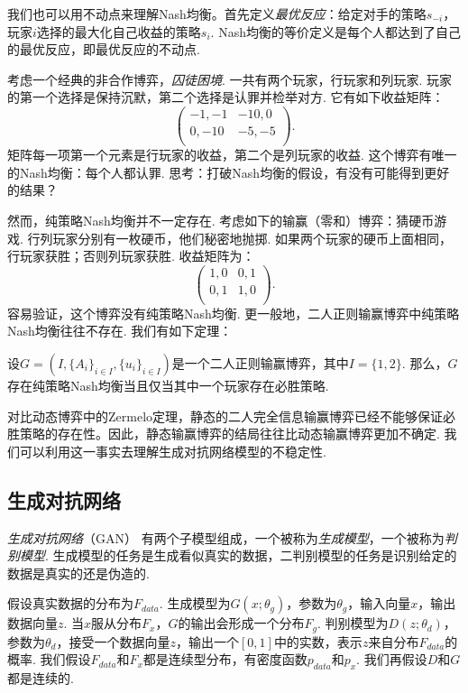 我们也可以用不动点来理解Nash均衡。首先定义\emph{最优反应}：给定对手的策略$s_{-i}$，玩家$i$选择的最大化自己收益的策略$s_i$. Nash均衡的等价定义是每个人都达到了自己的最优反应，即最优反应的不动点.


\begin{example}[囚徒困境]
考虑一个经典的非合作博弈，\emph{囚徒困境}. 一共有两个玩家，行玩家和列玩家. 玩家的第一个选择是保持沉默，第二个选择是认罪并检举对方. 它有如下收益矩阵：
\[
\begin{pmatrix}
-1,-1&-10,0\\
0,-10&-5,-5\\
\end{pmatrix}.
\]
矩阵每一项第一个元素是行玩家的收益，第二个是列玩家的收益. 这个博弈有唯一的Nash均衡：每个人都认罪. 思考：打破Nash均衡的假设，有没有可能得到更好的结果？
\end{example}

然而，纯策略Nash均衡并不一定存在. 考虑如下的输赢（零和）博弈：猜硬币游戏. 行列玩家分别有一枚硬币，他们秘密地抛掷. 如果两个玩家的硬币上面相同，行玩家获胜；否则列玩家获胜. 收益矩阵为：
    \[
    \begin{pmatrix}
    1,0&0,1\\
    0,1&1,0\\
    \end{pmatrix}.
    \]
容易验证，这个博弈没有纯策略Nash均衡. 更一般地，二人正则输赢博弈中纯策略Nash均衡往往不存在. 我们有如下定理：
\begin{theorem}
设$G=(I,\{A_i\}_{i\in I}, \{u_i\}_{i\in I})$是一个二人正则输赢博弈，其中$I=\{1,2\}$. 那么，$G$存在纯策略Nash均衡当且仅当其中一个玩家存在必胜策略. %
\end{theorem}
对比动态博弈中的Zermelo定理，静态的二人完全信息输赢博弈已经不能够保证必胜策略的存在性。因此，静态输赢博弈的结局往往比动态输赢博弈更加不确定. 我们可以利用这一事实去理解生成对抗网络模型的不稳定性.


\subsection{生成对抗网络}

\emph{生成对抗网络}（GAN） 有两个子模型组成，一个被称为\emph{生成模型}，一个被称为\emph{判别模型}. 生成模型的任务是生成看似真实的数据，二判别模型的任务是识别给定的数据是真实的还是伪造的.

假设真实数据的分布为$F_{data}$. 生成模型为$G(x;\theta_g)$，参数为$\theta_g$，输入向量$x$，输出数据向量$z$. 当$x$服从分布$F_x$，$G$的输出会形成一个分布$F_g$. 判别模型为$D(z;\theta_d)$，参数为$\theta_d$，接受一个数据向量$z$，输出一个$[0,1]$中的实数，表示$z$来自分布$F_{data}$的概率. 我们假设$F_{data}$和$F_x$都是连续型分布，有密度函数$p_{data}$和$p_x$. 我们再假设$D$和$G$都是连续的.

